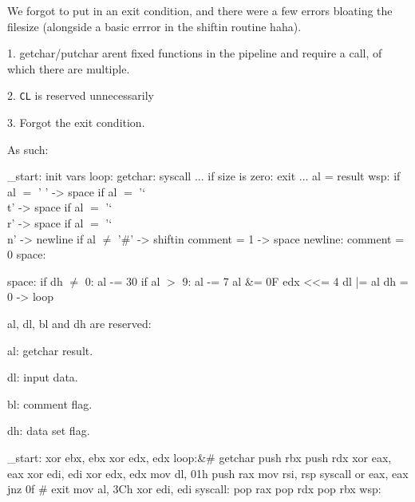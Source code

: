 \vfil\break

\null\vfil


\noindent We forgot to put in an exit condition, and there were a few errors
bloating the filesize (alongside a basic errror in the shiftin routine haha).

\item{1.} getchar/putchar arent fixed functions in the pipeline and require
a call, of which there are multiple.

\item{2.} {\tt CL} is reserved unnecessarily

\item{3.} Forgot the exit condition.

As such:

\code
	\_start:\cr
	\qquad init vars\cr
	loop:\cr
	getchar:\cr
	\qquad syscall ...\cr
	\qquad if size is zero:\cr
	\qquad\qquad exit ...\cr
	\qquad al = result\cr
	wsp:\cr
	\qquad if al $=$ ' ' -> space\cr
	\qquad if al $=$ '\char`\\t' -> space\cr
	\qquad if al $=$ '\char`\\r' -> space\cr
	\qquad if al $=$ '\char`\\n' -> newline\cr
	\qquad if al $\neq$ '\#' -> shiftin\cr
	\qquad comment = 1\cr
	\qquad -> space\cr
	newline:\cr
	\qquad comment = 0\cr
	space:\cr
\ecode
\page

\code
	space:\cr
	\qquad if dh $\neq$ 0:\cr
	\qquad al -= 30\cr
	\qquad if al $>$ 9:\cr
	\qquad\qquad al -= 7\cr
	\qquad al \&= 0F\cr
	\qquad edx <<= 4\cr
	\qquad dl |= al\cr
	\qquad dh = 0\cr
	\qquad -> loop\cr
\ecode

\noindent al, dl, bl and dh are reserved:
\item{al:} getchar result.
\item{dl:} input data.
\item{bl:} comment flag.
\item{dh:} data set flag.
\page

\vfil\break

\null\vfil

\code
	\_start:\cr
	\qquad xor ebx, ebx\cr
	\qquad xor edx, edx\cr
	loop:&\# getchar\cr
	\qquad push rbx\cr
	\qquad push rdx\cr
	\qquad xor eax, eax\cr
	\qquad xor edi, edi\cr
	\qquad xor edx, edx\cr
	\qquad mov dl, 01h\cr
	\qquad push rax\cr
	\qquad mov rsi, rsp\cr
	\qquad syscall\cr
	\qquad or eax, eax\cr
	\qquad jnz 0f\cr
	\qquad \# exit\cr
	\qquad mov al, 3Ch\cr
	\qquad xor edi, edi\cr
	\qquad syscall:\cr
	\qquad pop rax\cr
	\qquad pop rdx\cr
	\qquad pop rbx\cr
	wsp:\cr
\ecode
\page

